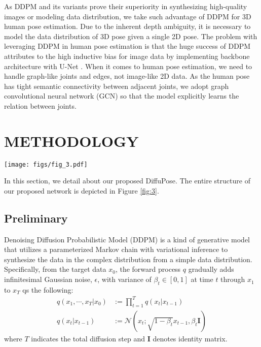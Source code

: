 \documentclass[letterpaper, 10 pt, conference]{ieeeconf}
\begin{document}
As DDPM and its variants prove their superiority in synthesizing high-quality images or modeling data distribution, we take such advantage of DDPM for 3D human pose estimation.
Due to the inherent depth ambiguity, it is necessary to model the data distribution of 3D pose given a single 2D pose.
The problem with leveraging DDPM in human pose estimation is that the huge success of DDPM attributes to the high inductive bias for image data by implementing backbone architecture with U-Net \cite{ ho2020denoising, dhariwal2021diffusion}.
When it comes to human pose estimation, we need to handle graph-like joints and edges, not image-like 2D data.
As the human pose has tight semantic connectivity between adjacent joints, we adopt graph convolutional neural network (GCN) \cite{kipf2016semi} so that the model explicitly learns the relation between joints. \section{METHODOLOGY}
\begin{figure*}[t]
    \centering
    \texttt{[image: figs/fig\_3.pdf]}
    \caption{Overview of DiffuPose. 
    A randomly sampled graph with joints $x_{T}$ is randomly sampled from Gaussian distribution and fed to the denoising Graph Convolutional Network (CGN) along with the 2D pose detection results.
    After multiple denoising steps, DiffuPose generates stochastic 3D pose outputs which correspond to the 2D pose input.
    }
    \vspace{-10pt}
    \label{fig:3}
\end{figure*}

In this section, we detail about our proposed DiffuPose.
The entire structure of our proposed network is depicted in Figure \ref{fig:3}.
\subsection{Preliminary}
Denoising Diffusion Probabilistic Model (DDPM) \cite{ho2020denoising} is a kind of generative model that utilizes a parameterized Markov chain with variational inference to synthesize the data in the complex distribution from a simple data distribution.
Specifically, from the target data $x_{0}$, the forward process $q$ gradually adds infinitesimal Gaussian noise, $\epsilon$, with variance of $\beta_{t}\in[0,1]$ at time $t$ through $x_{1}$ to $x_{T}$ qs the following:
\begin{equation}
    \begin{split}
        q(x_{1}, \cdots, x_{T}|x_{0}) &:= \prod_{t=1}^{T}q({x_{t}|x_{t-1}})\\
        q(x_{t}|x_{t-1}) &:= \mathcal{N}(x_{t};\sqrt{1-\beta_{t}}x_{t-1}, \beta_{t}\mathbf{I})
    \end{split}
    \label{eq1}
\end{equation}
where $T$ indicates the total diffusion step and $\mathbf{I}$ denotes identity matrix.
\end{document}
